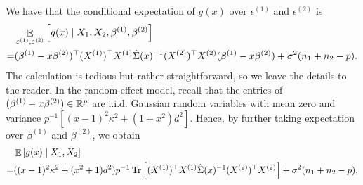 We have that the conditional expectation of $g(x)$ over $\epsilon^{(1)}$ and $\epsilon^{(2)}$ is
\begin{align*}
		&\mathop{\mathbb{E}}_{\varepsilon^{(1)}, \varepsilon^{(2)}}\left[ g(x) \mid X_1, X_2 ,\beta^{(1)},\beta^{(2)} \right] \\
		=& (\beta^{(1)}-x\beta^{(2)})^\top(X^{(1)} )^\top X^{(1)}  \hat\Sigma(x)^{-1} (X^{(2)})^\top X^{(2)} (\beta^{(1)}-x\beta^{(2)}) +\sigma^2(n_1+n_2-p).
\end{align*}
The calculation is tedious but rather straightforward, so we leave the details to the reader.
In the random-effect model, recall that the entries of $(\beta^{(1)}- x\beta^{(2)})\in \mathbb{R}^p$ are i.i.d. Gaussian random variables with mean zero and variance $p^{-1}[(x-1)^2\kappa^2 +(1+x^2) d^2]$.
Hence, by further taking expectation over $\beta^{(1)}$ and $\beta^{(2)}$, we obtain
\begin{align}
	&\mathop{\mathbb{E}}\left[ g(x) \mid X_1, X_2 \right] \nonumber\\
	=& ((x-1)^2\kappa^2 + (x^2+1)d^2){p^{-1}} \operatorname{Tr}\left[ (X^{(1)})^\top X^{(1)} \hat \Sigma(x)^{-1}(X^{(2)})^\top X^{(2)}\right]+\sigma^2(n_1+n_2-p), \label{EgA}
\end{align}

